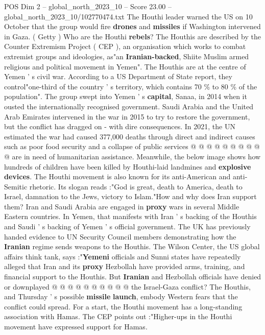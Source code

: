 \begin{textsample}{POS Dim 2 – global\_north\_2023\_10 – Score 23.00 – global\_north\_2023\_10/102770474.txt}  \label{ex:f2_pos_144}
The Houthi leader warned the US on 10 October that the group would fire \textbf{drones} and \textbf{missiles} if Washington intervened in Gaza. ( Getty ) Who are the Houthi \textbf{rebels}?
The Houthis are described by the Counter Extremism Project ( CEP ), an organisation which works to combat extremist groups and ideologies, as"an \textbf{Iranian-backed}, Shiite Muslim armed religious and political movement in Yemen".
The Houthis are at the centre of Yemen ' s civil war.
According to a US Department of State report, they control"one-third of the country ' s territory, which contains 70 \% to 80 \% of the population".
The group swept into Yemen ' s \textbf{capital}, Sanaa, in 2014 when it ousted the internationally recognised government.
Saudi Arabia and the United Arab Emirates intervened in the war in 2015 to try to restore the government, but the conflict has dragged on - with dire consequences.
In 2021, the UN estimated the war had caused 377,000 deaths through direct and indirect causes such as poor food security and a collapse of public services @ @ @ @ @ @ @ @ @ @ are in need of humanitarian assistance.
Meanwhile, the below image shows how hundreds of children have been killed by Houthi-laid landmines and \textbf{explosive} \textbf{devices}.
The Houthi movement is also known for its anti-American and anti-Semitic rhetoric.
Its slogan reads :"God is great, death to America, death to Israel, damnation to the Jews, victory to Islam."How and why does Iran support them?
Iran and Saudi Arabia are engaged in \textbf{proxy} wars in several Middle Eastern countries.
In Yemen, that manifests with Iran ' s backing of the Houthis and Saudi ' s backing of Yemen ' s official government.
The UK has previously handed evidence to UN Security Council members demonstrating how the \textbf{Iranian} regime sends weapons to the Houthis.
The Wilson Center, the US global affairs think tank, says :"\textbf{Yemeni} officials and Sunni states have repeatedly alleged that Iran and its \textbf{proxy} Hezbollah have provided arms, training, and financial support to the Houthis.
But \textbf{Iranian} and Hezbollah officials have denied or downplayed @ @ @ @ @ @ @ @ @ @ the Israel-Gaza conflict?
The Houthis, and Thursday ' s possible \textbf{missile} \textbf{launch}, embody Western fears that the conflict could spread.
For a start, the Houthi movement has a long-standing association with Hamas.
The CEP points out :"Higher-ups in the Houthi movement have expressed support for Hamas.

\end{textsample}
